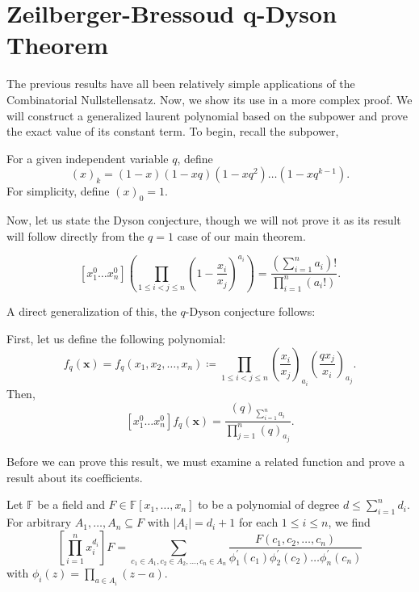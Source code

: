 \chapter{Zeilberger-Bressoud q-Dyson Theorem}
The previous results have all been relatively simple applications of the Combinatorial Nullstellensatz. Now, we show its use in a more complex proof. We will construct a generalized laurent polynomial based on the subpower and prove the exact value of its constant term. To begin, recall the subpower,
\begin{notation}[Subpower]
	For a given independent variable $q$, define \[
		\left( x \right) _{k} = \left( 1-x \right) \left(  1-xq \right) \left( 1-xq^2 \right) \ldots \left( 1-xq^{k-1} \right)
	.\] 	For simplicity, define $\left( x \right) _{0} = 1$.
\end{notation}
Now, let us state the Dyson conjecture, though we will not prove it as its result will follow directly from the \(q = 1\) case of our main theorem.
\begin{theorem}
	\[
		[x_1^{0}\ldots x_{n}^{0}]\left( \prod_{1\le i < j \le n}^{}  \left( 1- \frac{x_{i}}{x_{j}} \right)^{a_{i}}  \right)  = \frac{\left( \sum_{i= 1}^{n} a_{i} \right) ! }{\prod_{i= 1}^{n} \left( a_{i}! \right)}
	.\]
\end{theorem}
A direct generalization of this, the \(q\)-Dyson conjecture follows:
\begin{theorem}
	First, let us define the following polynomial:
	\[
		f_{q}\left( \textbf{x} \right) = f_{q}\left( x_1, x_2, \ldots, x_{n} \right) \coloneqq \prod_{1\le i < j \le n}^{} \left( \frac{x_{i}}{x_{j}} \right) _{a_{i}} \left( \frac{qx_{j}}{x_{i}} \right) _{a_{j}}
	.\]
	Then,  \[
		[x_1^{0}\ldots x_{n}^{0}]f_{q}\left( \textbf{x} \right)  = \frac{\left( q \right) _{\sum_{i= 1}^{n} a_{i}}}{\prod_{j= 1}^{n} \left( q \right) _{a_{j}}}
	.\]
\end{theorem}
Before we can prove this result, we must examine a related function and prove a result about its coefficients.
\begin{lemma}
	Let \(\mathbb{F}\) be a field and \(F \in \mathbb{F}\left[ x_1, \ldots, x_{n} \right] \) to be a polynomial of degree \(d  \le \sum_{i= 1}^{n} d_{i}\). For arbitrary \(A_1, \ldots, A_{n} \subseteq F\) with \(\left| A_{i} \right| = d_{i} + 1 \) for each \(1 \le i \le n\), we find \[\left[ \prod_{i=1}^{n} x_{i}^{d_{i}} \right] F = \sum_{c_1 \in A_1, c_2 \in A_2, \ldots, c_{n} \in A_{n} }^{} \frac{F\left( c_1, c_2, \ldots, c_{n} \right) }{ \phi_1 ^{\prime}\left( c_1 \right)  \phi_2^{\prime}\left( c_2 \right) \ldots \phi _{n} ^{\prime}\left( c_{n} \right) } \] with \(\phi _{i}\left( z \right)  = \prod_{a \in A_{i}}^{} \left( z - a \right) \).
\end{lemma}
